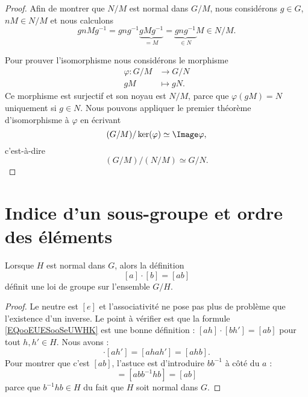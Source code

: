 \begin{proof}
	Afin de montrer que \( N/M\) est normal dans \( G/M\), nous considérons \( g\in G\), \( nM\in N/M\) et nous calculons
	\begin{equation}
		gnMg^{-1}=gng^{-1}\underbrace{gMg^{-1}}_{=M}=\underbrace{gng^{-1}}_{\in N}M\in N/M.
	\end{equation}

	Pour prouver l'isomorphisme nous considérons le morphisme
	\begin{equation}
		\begin{aligned}
			\varphi\colon G/M & \to G/N     \\
			gM                & \mapsto gN.
		\end{aligned}
	\end{equation}
	Ce morphisme est surjectif et son noyau est \( N/M\), parce que \( \varphi(gM)=N\) uniquement si \( g\in N\). Nous pouvons appliquer le premier théorème d'isomorphisme à \( \varphi\) en écrivant
	\begin{equation}
		(G/M)/\ker(\varphi)\simeq\Image \varphi,
	\end{equation}
	c'est-à-dire
	\begin{equation}
		(G/M)/(N/M)\simeq G/N.
	\end{equation}
\end{proof}

\section{Indice d'un sous-groupe et ordre des éléments}

\begin{lemma}       \label{LEMooFNVRooRCkjLc}
	Lorsque \( H\) est normal dans \( G\), alors la définition
	\begin{equation}        \label{EQooEUESooSeUWHK}
		[a]\cdot[b]=[ab]
	\end{equation}
	définit une loi de groupe sur l'ensemble \( G/H\).
\end{lemma}

\begin{proof}
	Le neutre est \( [e]\) et l'associativité ne pose pas plus de problème que l'existence d'un inverse. Le point à vérifier est que la formule \eqref{EQooEUESooSeUWHK} est une bonne définition : \( [ah]\cdot [bh']=[ab]\) pour tout \( h,h'\in H\). Nous avons :
	\begin{equation}
		[ah]\cdot [ah']=[ahah']=[ahb].
	\end{equation}
	Pour montrer que c'est \( [ab]\), l'astuce est d'introduire \( bb^{-1}\) à côté du \( a\) :
	\begin{equation}
		[ahb]=[abb^{-1}hb]=[ab]
	\end{equation}
	parce que \( b^{-1} hb\in H\) du fait que \( H\) soit normal dans \( G\).
\end{proof}

